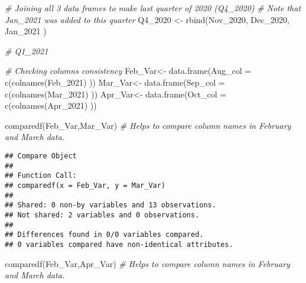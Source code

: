 \documentclass[
]{article}
\newenvironment{Shaded}{\begin{snugshade}}{\end{snugshade}}
\newcommand{\AttributeTok}[1]{\textcolor[rgb]{0.77,0.63,0.00}{#1}}
\newcommand{\CommentTok}[1]{\textcolor[rgb]{0.56,0.35,0.01}{\textit{#1}}}
\newcommand{\FunctionTok}[1]{\textcolor[rgb]{0.00,0.00,0.00}{#1}}
\newcommand{\NormalTok}[1]{#1}
\newcommand{\OtherTok}[1]{\textcolor[rgb]{0.56,0.35,0.01}{#1}}
\begin{document}
\begin{Shaded}
\begin{Highlighting}[]
\CommentTok{\# Joining all 3 data frames to make last quarter of 2020 (Q4\_2020)}
\CommentTok{\# Note that Jan\_2021 was added to this quarter }
\NormalTok{  Q4\_2020 }\OtherTok{\textless{}{-}} \FunctionTok{rbind}\NormalTok{(Nov\_2020, Dec\_2020, Jan\_2021 )}
\end{Highlighting}
\end{Shaded}

\begin{Shaded}
\begin{Highlighting}[]
\CommentTok{\# Q1\_2021 }
\end{Highlighting}
\end{Shaded}

\begin{Shaded}
\begin{Highlighting}[]
\CommentTok{\# Checking columns consistency }
\NormalTok{ Feb\_Var}\OtherTok{\textless{}{-}} \FunctionTok{data.frame}\NormalTok{(}\AttributeTok{Aug\_col =}  \FunctionTok{c}\NormalTok{(}\FunctionTok{colnames}\NormalTok{(Feb\_2021) ))}
\NormalTok{ Mar\_Var}\OtherTok{\textless{}{-}} \FunctionTok{data.frame}\NormalTok{(}\AttributeTok{Sep\_col =}  \FunctionTok{c}\NormalTok{(}\FunctionTok{colnames}\NormalTok{(Mar\_2021) ))}
\NormalTok{ Apr\_Var}\OtherTok{\textless{}{-}} \FunctionTok{data.frame}\NormalTok{(}\AttributeTok{Oct\_col =}  \FunctionTok{c}\NormalTok{(}\FunctionTok{colnames}\NormalTok{(Apr\_2021) ))}
 
 \FunctionTok{comparedf}\NormalTok{(Feb\_Var,Mar\_Var) }\CommentTok{\# Helps to compare column names in February and March data.}
\end{Highlighting}
\end{Shaded}

\begin{verbatim}
## Compare Object
## 
## Function Call: 
## comparedf(x = Feb_Var, y = Mar_Var)
## 
## Shared: 0 non-by variables and 13 observations.
## Not shared: 2 variables and 0 observations.
## 
## Differences found in 0/0 variables compared.
## 0 variables compared have non-identical attributes.
\end{verbatim}

\begin{Shaded}
\begin{Highlighting}[]
 \FunctionTok{comparedf}\NormalTok{(Feb\_Var,Apr\_Var) }\CommentTok{\# Helps to compare column names in February and March data.}
\end{Highlighting}
\end{Shaded}
\end{document}
